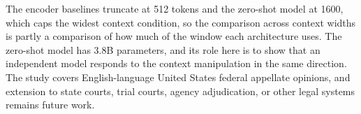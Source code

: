The encoder baselines truncate at 512 tokens and the zero-shot model at 1600,
which caps the widest context condition, so the comparison across context widths
is partly a comparison of how much of the window each architecture uses. The
zero-shot model has 3.8B parameters, and its role here is to show that an
independent model responds to the context manipulation in the same direction. The
study covers English-language United States federal appellate opinions, and
extension to state courts, trial courts, agency adjudication, or other legal
systems remains future work.
